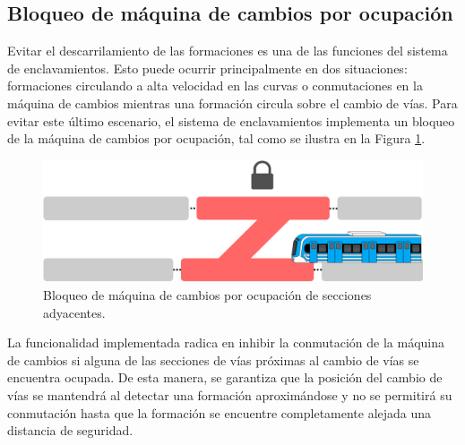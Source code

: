 \subsection{Bloqueo de máquina de cambios por ocupación}

	\label{sec:function_1}

	Evitar el descarrilamiento de las formaciones es una de las funciones del sistema de enclavamientos. Esto puede ocurrir principalmente en dos situaciones: formaciones circulando a alta velocidad en las curvas o conmutaciones en la máquina de cambios mientras una formación circula sobre el cambio de vías. Para evitar este último escenario, el sistema de enclavamientos implementa un bloqueo de la máquina de cambios por ocupación, tal como se ilustra en la Figura \ref{fig:ACG_ocupacion}.

    \begin{figure}[!h]
        \centering
        \includegraphics[width=1\textwidth]{Figuras/ocupacion}
        \centering\caption{Bloqueo de máquina de cambios por ocupación de secciones adyacentes.}
        \label{fig:ACG_ocupacion}
    \end{figure}

	La funcionalidad implementada radica en inhibir la conmutación de la máquina de cambios si alguna de las secciones de vías próximas al cambio de vías se encuentra ocupada. De esta manera, se garantiza que la posición del cambio de vías se mantendrá al detectar una formación aproximándose y no se permitirá su conmutación hasta que la formación se encuentre completamente alejada una distancia de seguridad. 